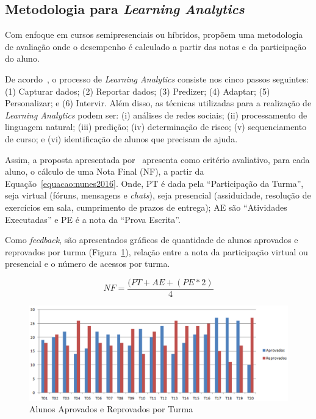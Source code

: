 \subsection{Metodologia para \textit{Learning Analytics}}

Com enfoque em cursos semipresenciais ou híbridos, \cite{Nunes:2016} propõem uma metodologia de avaliação onde o desempenho é calculado a partir das notas e da participação do aluno. 

De acordo~\cite{Nunes:2016}, o processo de \textit{Learning Analytics} consiste nos cinco passos seguintes: (1) Capturar dados; (2) Reportar dados; (3) Predizer; (4) Adaptar; (5) Personalizar; e (6) Intervir. Além disso, as técnicas utilizadas para a realização de \textit{Learning Analytics} podem ser: (i) análises de redes sociais; (ii) processamento de linguagem natural; (iii) predição; (iv) determinação de risco; (v) sequenciamento de curso; e (vi) identificação de alunos que precisam de ajuda.

Assim, a proposta apresentada por~\cite{Nunes:2016} apresenta como critério avaliativo, para cada aluno, o cálculo de uma Nota Final (NF), a partir da Equação~\ref{equacao:nunes2016}. Onde, PT é dada pela ``Participação da Turma'', seja virtual (fóruns, mensagens e \textit{chats}), seja presencial (assiduidade, resolução de exercícios em sala, cumprimento de prazos de entrega); AE são ``Atividades Executadas'' e PE é a nota da ``Prova Escrita''. 

Como \textit{feedback}, são apresentados gráficos de quantidade de alunos aprovados e reprovados por turma (Figura~\ref{fig:Nunes2016}), relação entre a nota da participação virtual ou presencial e o número de acessos por turma.

\begin{equation}\label{equacao:nunes2016}
NF = \frac{(PT + AE + (PE*2)}{4}
\end{equation}

\begin{figure}[htb]
	\centering
	\includegraphics[width=1\linewidth]{chapters/works/Nunes2016.png}
	\captionsetup{justification=centering}
	\caption{Alunos Aprovados e Reprovados por Turma}
	\label{fig:Nunes2016}
\end{figure}

